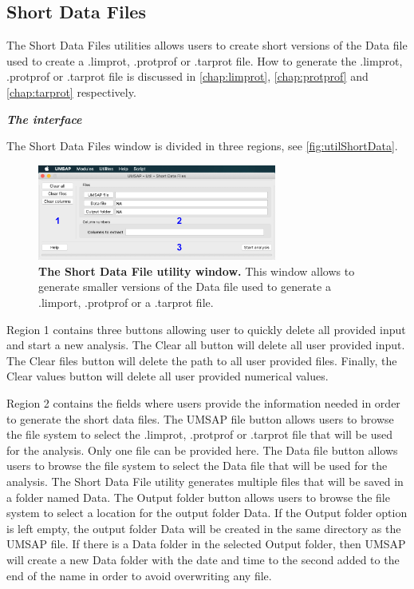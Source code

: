 \subsection{Short Data Files}
\label{subsec:utilShortDF}

The Short Data Files utilities allows users to create short versions of the Data file used to create a .limprot, .protprof or .tarprot file. How to generate the .limprot, .protprof or .tarprot file is discussed in \autoref{chap:limprot}, \autoref{chap:protprof} and \autoref{chap:tarprot} respectively.

\textit{\textbf{The interface}}

The Short Data Files window is divided in three regions, see \autoref{fig:utilShortData}.

\begin{figure}[h]
	\centering
	\includegraphics[width=0.7\textwidth]{./IMAGES/UTIL-SHORTDF-WINDOW/util-shortdf.jpg}	    
	\caption[The Short Data File utility window]{\textbf{The Short Data File utility window.} This window allows to generate smaller versions of the Data file used to generate a .limport, .protprof or a .tarprot file.} 
	\label{fig:utilShortData}
	\vspace{-5pt} 	
\end{figure} 

Region \num{1} contains three buttons allowing user to quickly delete all provided input and start a new analysis. The Clear all button will delete all user provided input. The Clear files button will delete the path to all user provided files. Finally, the Clear values button will delete all user provided numerical values.

Region \num{2} contains the fields where users provide the information needed in order to generate the short data files. The UMSAP file button allows users to browse the file system to select the .limprot, .protprof or .tarprot file that will be used for the analysis. Only one file can be provided here. The Data file button allows users to browse the file system to select the Data file that will be used for the analysis. The Short Data File utility generates multiple files that will be saved in a folder named Data. The Output folder button allows users to browse the file system to select a location for the output folder Data. If the Output folder option is left empty, the output folder Data will be created in the same directory as the UMSAP file. If there is a Data folder in the selected Output folder, then UMSAP will create a new Data folder with the date and time to the second added to the end of the name in order to avoid overwriting any file. 

